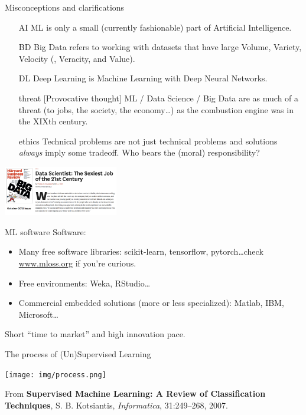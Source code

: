 \documentclass{beamer}
\begin{document}
\begin{frame}{Misconceptions and clarifications}
\begin{itemize}
\item[AI] ML is only a small (currently fashionable) part of Artificial Intelligence.
\item[BD] Big Data refers to working with datasets that have large Volume, Variety, Velocity (, Veracity, and Value).
\item[DL] Deep Learning is Machine Learning with Deep Neural Networks.
\item[threat] [Provocative thought] ML / Data Science / Big Data are as much of a threat (to jobs, the society, the economy\ldots) as the combustion engine was in the XIXth century.
\item[ethics] Technical problems are not just technical problems and solutions \emph{always} imply some tradeoff. Who bears the (moral) responsibility?
\end{itemize}
\begin{center}
	\includegraphics[width=5cm]{img/datascientist.png}
\end{center}
\end{frame}

\begin{frame}{ML software}
Software:
\begin{itemize}
\item Many free software libraries: scikit-learn, tensorflow, pytorch\ldots check \url{www.mloss.org} if you're curious.
\item Free environments: Weka, RStudio\ldots
\item Commercial embedded solutions (more or less specialized): Matlab, IBM, Microsoft\ldots
\end{itemize}
\vspace{2em}
Short ``time to market'' and high innovation pace.
\end{frame}

\begin{frame}{The process of (Un)Supervised Learning}
\begin{center}
\texttt{[image: img/process.png]}
\end{center}
\vspace{-0.5cm}
{\footnotesize From \textbf{Supervised Machine Learning: A Review of Classification Techniques}, S. B. Kotsiantis, \textit{Informatica}, 31:249--268, 2007.}
\end{frame}
\end{document}
